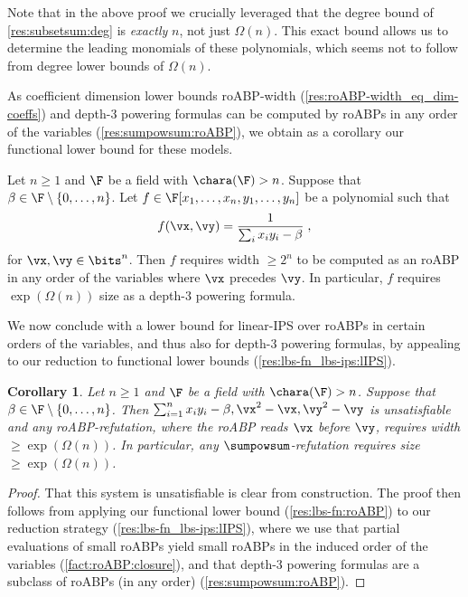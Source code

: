 \documentclass[11pt]{article}
\numberwithin{equation}{section}
\newtheorem{corollary}[theorem]{Corollary}
\theoremstyle{definition}
\theoremstyle{plain}
\begin{document}
Note that in the above proof we crucially leveraged that the degree bound of \autoref{res:subsetsum:deg} is \emph{exactly} $n$, not just $\Omega(n)$.  This exact bound allows us to determine the leading monomials of these polynomials, which seems not to follow from degree lower bounds of $\Omega(n)$.

As coefficient dimension lower bounds roABP-width (\autoref{res:roABP-width_eq_dim-coeffs}) and depth-3 powering formulas can be computed by roABPs in any order of the variables (\autoref{res:sumpowsum:roABP}), we obtain as a corollary our functional lower bound for these models.

\begin{corollarywp}\label{res:lbs-fn:roABP}
        Let $n\ge 1$ and $\F$ be a field with $\chara(\F)>n$.  Suppose that $\beta\in\F\setminus\{0,\ldots,n\}$.  Let $f\in\F[x_1,\ldots,x_n,y_1,\ldots,y_n]$ be a polynomial such that
        \[
                f(\vx,\vy)=\frac{1}{\sum_i x_iy_i-\beta}
                \;,
        \]
        for $\vx,\vy\in\bits^n$.  Then $f$ requires width $\ge 2^n$ to be computed as an roABP in any order of the variables where $\vx$ precedes $\vy$.  In particular, $f$ requires
%
$\exp(\Omega(n))$ size    %
as a depth-$3$ powering formula.
\end{corollarywp}

We now conclude with a lower bound for linear-IPS over roABPs in certain orders of the variables, and thus also for depth-$3$ powering formulas, by appealing to our reduction to functional lower bounds (\autoref{res:lbs-fn_lbs-ips:lIPS}).

\begin{corollary}\label{res:lbs-fn:lbs-ips:fixed-order}
        Let $n\ge 1$ and $\F$ be a field with $\chara(\F)>n$.  Suppose that $\beta\in \F\setminus\{0,\ldots,n\}$.  Then $\sum_{i=1}^n x_iy_i-\beta,\vx^2-\vx,\vy^2-\vy$ is unsatisfiable and any roABP-\lIPS refutation, where the roABP reads $\vx$ before $\vy$, requires width $\ge \exp(\Omega(n))$.  In particular, any $\sumpowsum$-\lIPS refutation requires size $\ge\exp(\Omega(n))$.
\end{corollary}
\begin{proof}
        That this system is unsatisfiable is clear from construction.  The proof then follows from applying our functional lower bound (\autoref{res:lbs-fn:roABP}) to our reduction strategy (\autoref{res:lbs-fn_lbs-ips:lIPS}), where we use that partial evaluations of small roABPs yield small roABPs in the induced order of the variables (\autoref{fact:roABP:closure}), and that depth-3 powering formulas are a subclass of roABPs (in any order) (\autoref{res:sumpowsum:roABP}).
\end{proof}
\end{document}
